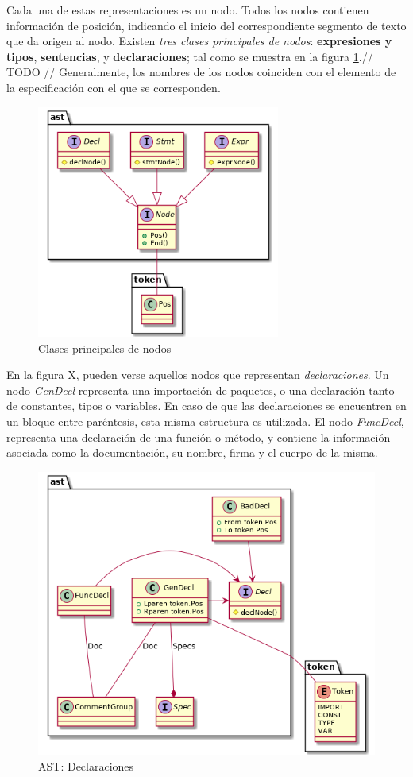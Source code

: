 Cada una de estas representaciones es un nodo.
Todos los nodos contienen información de posición, indicando el inicio del correspondiente segmento
de texto que da origen al nodo.
Existen \textit{tres clases principales de nodos}: \textbf{expresiones y tipos}, \textbf{sentencias},
y \textbf{declaraciones}; tal como se muestra en la figura \ref{NodeClasses}.// TODO //
Generalmente, los nombres de los nodos coinciden con el elemento de la especificación con el que
se corresponden.

\begin{figure}[H]
  \label{NodeClasses}
  \includegraphics[width=8cm]{implementation/ast_nodes.png}
  \centering
  \caption{Clases principales de nodos}
\end{figure}

En la figura X, pueden verse aquellos nodos que representan \textit{declaraciones}.
Un nodo \textit{GenDecl} representa una importación de paquetes, o una declaración tanto de
constantes, tipos o variables.
En caso de que las declaraciones se encuentren en un bloque entre paréntesis, esta misma
estructura es utilizada.
El nodo \textit{FuncDecl}, representa una declaración de una función o método, y contiene
la información asociada como la documentación, su nombre, firma y el cuerpo de la misma.

\begin{figure}[H]
  \includegraphics[width=12cm]{implementation/ast_decls.png}
  \centering
  \caption{AST: Declaraciones}
\end{figure}

